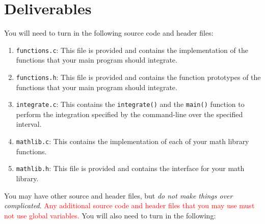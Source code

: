 \section{Deliverables}

You will need to turn in the following source code and header files:

\begin{enumerate}
  \item \texttt{functions.c}: This file is provided and contains the
    implementation of the functions that your main program should
    integrate.
  \item \texttt{functions.h}: This file is provided and contains the
    function prototypes of the functions that your main program should
    integrate.
  \item \texttt{integrate.c}: This contains the \texttt{integrate()} and  the
\texttt{main()} function to perform the integration specified by the command-line over the specified
    interval.
  \item \texttt{mathlib.c}: This contains the implementation of each of
    your math library functions.
  \item \texttt{mathlib.h}: This file is provided and contains the
    interface for your math library.
\end{enumerate}

You may have other source and header files, but \emph{do not make things
over complicated}. \textcolor{red}{Any additional source code and header
files that you may use must not use global variables.}
You will also need to turn in the following:

